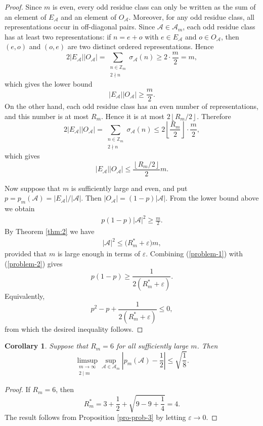 \documentclass[12pt,a4paper,reqno]{amsart}
\numberwithin{equation}{section}
\newcommand{\floor}[1]{\left\lfloor #1\right\rfloor}
\theoremstyle{plain}
\newtheorem{corollary}{Corollary}
\theoremstyle{definition}
\begin{document}
\begin{proof}
Since $m$ is even, every odd residue class can only be written as the sum of an element of $E_{\mathcal A}$ and an element of $O_{\mathcal A}$. Moreover, for any odd residue class, all representations occur in off-diagonal pairs. Since $\mathcal A\in\mathscr A_m$, each odd residue class has at least two representations: if $n=e+o$ with $e\in E_{\mathcal A}$ and $o\in O_{\mathcal A}$, then $(e,o)$ and $(o,e)$ are two distinct ordered representations. Hence
$$
2|E_{\mathcal{A}}||O_{\mathcal{A}}|= \sum_{\substack{n\in \mathbb{Z}_m\\ 2\nmid n}}\sigma_{\mathcal{A}}(n)
\ge 2\cdot \frac{m}{2}=m,
$$
which gives the lower bound
$$
|E_{\mathcal{A}}||O_{\mathcal{A}}|\ge \frac{m}{2}.
$$
On the other hand, each odd residue class has an even number of representations, and this number is at most $R_m$. Hence it is at most $2\floor{R_m/2}$. Therefore
$$
2|E_{\mathcal{A}}||O_{\mathcal{A}}|= \sum_{\substack{n\in \mathbb{Z}_m\\ 2\nmid n}}\sigma_{\mathcal{A}}(n)
\le 2\floor{\frac{R_m}{2}}\cdot \frac m2,
$$
which gives
$$
|E_{\mathcal{A}}||O_{\mathcal{A}}|\le \frac{\floor{R_m/2}}{2}m.
$$

Now suppose that $m$ is sufficiently large and even, and put $p=p_m(\mathcal A)=|E_{\mathcal A}|/|\mathcal A|$. Then $|O_{\mathcal A}|=(1-p)|\mathcal A|$. From the lower bound above we obtain
\begin{align}\label{problem-1}
    p(1-p)|\mathcal{A}|^2\ge \frac{m}{2}.
\end{align}
By Theorem \ref{thm:2} we have 
\begin{align}\label{problem-2}
|\mathcal{A}|^2\le \big(R_m^*+\varepsilon\big)m,
\end{align}
provided that $m$ is large enough in terms of $\varepsilon$. Combining (\ref{problem-1}) with (\ref{problem-2}) gives
$$
p(1-p)\ge \frac{1}{2(R_m^*+\varepsilon)}.
$$
Equivalently,
$$
p^2-p+\frac{1}{2(R_m^*+\varepsilon)}\le 0,
$$
from which the desired inequality follows.
\end{proof}

\begin{corollary}\label{cor-prob-3}
Suppose that $R_m=6$ for all sufficiently large $m$. Then
\[
\limsup_{\substack{m\to\infty\\2\mid m}}\sup_{\mathcal A\in\mathscr A_m}\left|p_m(\mathcal A)-\frac12\right|
\le \sqrt{\frac18}.
\]
\end{corollary}
\begin{proof}
If $R_m=6$, then
\[
R_m^*=3+\frac12+\sqrt{9-9+\frac14}=4.
\]
The result follows from Proposition \ref{pro-prob-3} by letting $\varepsilon\to0$.
\end{proof}
\end{document}
